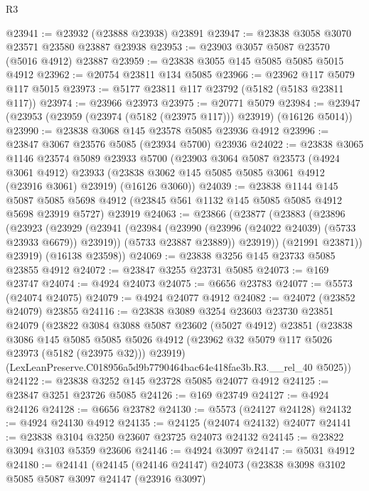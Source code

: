\begin{lexlean}{R3}
\begin{coremodule}
@23941 := @23932 (@23888 @23938) @23891
@23947 := @23838 @3058 @3070 @23571 @23580 @23887 @23938
@23953 := @23903 @3057 @5087 @23570 (@5016 @4912) @23887
@23959 := @23838 @3055 @145 @5085 @5085 @5015 @4912
@23962 := @20754 @23811 @134 @5085
@23966 := @23962 @117 @5079 @117 @5015
@23973 := @5177 @23811 @117 @23792 (@5182 (@5183 @23811 @117))
@23974 := @23966 @23973
@23975 := @20771 @5079
@23984 := @23947 (@23953 (@23959 (@23974 (@5182 (@23975 @117))) @23919) (@16126 @5014))
@23990 := @23838 @3068 @145 @23578 @5085 @23936 @4912
@23996 := @23847 @3067 @23576 @5085 (@23934 @5700) @23936
@24022 := @23838
    @3065
    @1146
    @23574
    @5089
    @23933
    @5700
    (@23903
      @3064
      @5087
      @23573
      (@4924 @3061 @4912)
      @23933
      (@23838 @3062 @145 @5085 @5085 @3061 @4912 (@23916 @3061) @23919)
      (@16126 @3060))
@24039 := @23838
    @1144
    @145
    @5087
    @5085
    @5698
    @4912
    (@23845 @561 @1132 @145 @5085 @5085 @4912 @5698 @23919 @5727)
    @23919
@24063 := @23866
    (@23877
      (@23883
        (@23896
          (@23923
            (@23929
              (@23941
                (@23984 (@23990 (@23996 (@24022 @24039) (@5733 @23933 @6679)) @23919))
                (@5733 @23887 @23889))
              @23919))
          (@21991 @23871))
        @23919)
      (@16138 @23598))
@24069 := @23838 @3256 @145 @23733 @5085 @23855 @4912
@24072 := @23847 @3255 @23731 @5085
@24073 := @169 @23747
@24074 := @4924 @24073
@24075 := @6656 @23783
@24077 := @5573 (@24074 @24075)
@24079 := @4924 @24077 @4912
@24082 := @24072 (@23852 @24079) @23855
@24116 := @23838
    @3089
    @3254
    @23603
    @23730
    @23851
    @24079
    (@23822
      @3084
      @3088
      @5087
      @23602
      (@5027 @4912)
      @23851
      (@23838
        @3086
        @145
        @5085
        @5085
        @5026
        @4912
        (@23962 @32 @5079 @117 @5026 @23973 (@5182 (@23975 @32)))
        @23919)
      (LexLeanPreserve.C018956a5d9b7790464bac64e418fae3b.R3.__rel_40 @5025))
@24122 := @23838 @3252 @145 @23728 @5085 @24077 @4912
@24125 := @23847 @3251 @23726 @5085
@24126 := @169 @23749
@24127 := @4924 @24126
@24128 := @6656 @23782
@24130 := @5573 (@24127 @24128)
@24132 := @4924 @24130 @4912
@24135 := @24125 (@24074 @24132) @24077
@24141 := @23838 @3104 @3250 @23607 @23725 @24073 @24132
@24145 := @23822 @3094 @3103 @5359 @23606
@24146 := @4924 @3097
@24147 := @5031 @4912
@24180 := @24141
    (@24145
      (@24146 @24147)
      @24073
      (@23838
        @3098
        @3102
        @5085
        @5087
        @3097
        @24147
        (@23916 @3097)

\end{coremodule}
\end{lexlean}
